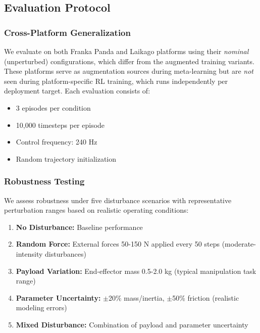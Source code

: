 \documentclass[DTMColor]{ROB-New}
\newcommand{\rev}[1]{{\color{blue}#1}}
\begin{document}
\subsection{Evaluation Protocol}

\subsubsection{Cross-Platform Generalization}
We evaluate on both Franka Panda and Laikago platforms using their \rev{\textit{nominal} (unperturbed) configurations, which differ from the augmented training variants}. \rev{These platforms serve as augmentation sources during meta-learning but are \textit{not} seen during platform-specific RL training, which runs independently per deployment target.} Each evaluation consists of:
\begin{itemize}
    \item 3 episodes per condition
    \item 10,000 timesteps per episode
    \item Control frequency: 240 Hz
    \item Random trajectory initialization
\end{itemize}

\subsubsection{Robustness Testing}
We assess robustness under five disturbance scenarios with representative perturbation ranges based on realistic operating conditions:
\begin{enumerate}
    \item \textbf{No Disturbance:} Baseline performance
    \item \textbf{Random Force:} External forces 50-150 N applied every 50 steps (moderate-intensity disturbances)
    \item \textbf{Payload Variation:} End-effector mass 0.5-2.0 kg (typical manipulation task range)
    \item \textbf{Parameter Uncertainty:} $\pm$20\% mass/inertia, $\pm$50\% friction (realistic modeling errors)
    \item \textbf{Mixed Disturbance:} Combination of payload and parameter uncertainty
\end{enumerate}
\end{document}
